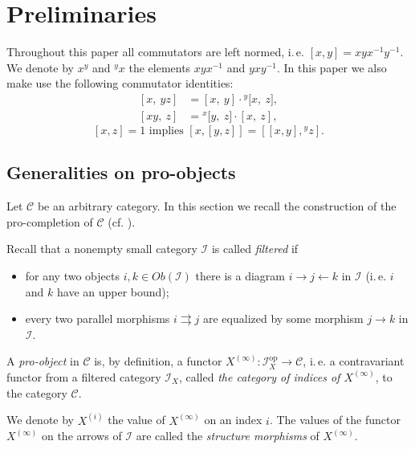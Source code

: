 \documentclass{article}
\numberwithin{equation}{section}
\theoremstyle{definition}
\theoremstyle{remark}
\newcommand{\op}{\mathrm{op}}
\newcommand{\up}[2]{{^{#1}\!{#2}}}
\begin{document}
\section{Preliminaries}
Throughout this paper all commutators are left normed, i.\,e. $[x, y] = xyx^{-1}y^{-1}$. We denote by $x^y$ and $\up{y}x$ the elements $xyx^{-1}$ and $yxy^{-1}$.
In this paper we also make use the following commutator identities:
\begin{align}
\label{eq:comm-mult-rhs}[x,\ yz]& =   [x,\ y] \cdot \up{y}[x,\ z],
\\ \label{eq:comm-mult-lhs}[xy,\ z]& = \up{x}[y,\ z] \cdot [x,\ z],
\end{align}
\begin{equation} \label{eq:HW-corr} [x,z] = 1 \text{ implies } [x, [y,z]] = [[x,y],\up{y}z].
\end{equation}


\subsection{Generalities on pro-objects}
Let \(\mathcal C\) be an arbitrary category.
In this section we recall the construction of the pro-completion of \(\mathcal C\) (cf. \cite[Section~6.1]{SK06}).

Recall that a nonempty small category \(\mathcal I\) is called {\it filtered} if
\begin{itemize}
 \item for any two objects \(i, k \in Ob(\mathcal{I})\) there is a diagram \(i \to j \leftarrow k\) in \(\mathcal I\) (i.\,e. $i$ and $k$ have an upper bound);
 \item every two parallel morphisms \(i \rightrightarrows j\) are equalized by some morphism \(j \to k\) in \(\mathcal I\).
\end{itemize}
A {\it pro-object} in \(\mathcal C\) is, by definition, a functor $X^{(\infty)}\colon \mathcal{I}_X^{\op} \to \mathcal{C}$, i.\,e. a contravariant functor from a filtered category \(\mathcal I_X\), called {\it the category of indices of $X^{(\infty)}$}, to the category \(\mathcal C\). 

We denote by \(X^{(i)}\) the value of \(X^{(\infty)}\) on an index \(i\).
The values of the functor $X^{(\infty)}$ on the arrows of $\mathcal{I}$ are called the {\it structure morphisms} of $X^{(\infty)}$.
\end{document}
